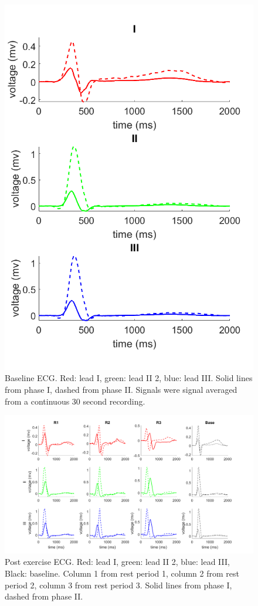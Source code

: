 \documentclass[12pt]{article}
\begin{document}
\begin{figure}[H]
	
	\centering
	\includegraphics[width = .8\textwidth]{Figures/baselines.png}
	\caption{Baseline ECG. Red: lead I, green: lead II 2, blue: lead III. Solid lines from phase I, dashed from phase II. Signals were signal averaged from a continuous 30 second recording.}
	\label{base}
\end{figure}

\begin{figure}[H]
	
	\centering
	\includegraphics[width = .8\textwidth]{Figures/PostExercise.png}
	\caption{Post exercise ECG. Red: lead I, green: lead II 2, blue: lead III, Black: baseline. Column 1 from rest period 1, column 2 from rest period 2, column 3 from rest period 3. Solid lines from phase I, dashed from phase II.}
	\label{exer}
\end{figure}
\end{document}
